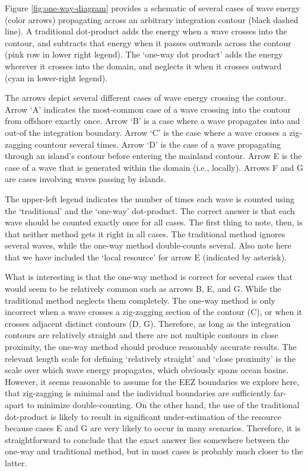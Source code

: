 Figure \ref{fig:one-way-diagram} provides a schematic of several cases of wave energy (color arrows) propagating across an arbitrary integration contour (black dashed line). A traditional dot-product adds the energy when a wave crosses into the contour, and subtracts that energy when it passes outwards across the contour (pink row in lower right legend). The `one-way dot product' adds the energy wherever it crosses into the domain, and neglects it when it crosses outward (cyan in lower-right legend).

The arrows depict several different cases of wave energy crossing the contour. Arrow `A' indicates the most-common case of a wave crossing into the contour from offshore exactly once. Arrow `B' is a case where a wave propagates into and out-of the integration boundary. Arrow `C' is the case where a wave crosses a zig-zagging countour several times. Arrow `D' is the case of a wave propagating through an island's contour before entering the mainland contour. Arrow E is the case of a wave that is generated within the domain (i.e., locally). Arrows F and G are cases involving waves passing by islands.

The upper-left legend indicates the number of times each wave is counted using the `traditional' and the `one-way' dot-product. The correct answer is that each wave should be counted exactly once for all cases. The first thing to note, then, is that neither method gets it right in all cases. The traditional method ignores several waves, while the one-way method double-counts several. Also note here that we have included the `local resource' for arrow E (indicated by asterisk).

What is interesting is that the one-way method is correct for several cases that would seem to be relatively common such as arrows B, E, and G. While the traditional method neglects them completely. The one-way method is only incorrect when a wave crosses a zig-zagging section of the contour (C), or when it crosses adjacent distinct contours (D, G). Therefore, as long as the integration contours are relatively straight and there are not multiple contours in close proximity, the one-way method should produce reasonably accurate results. 
The relevant length scale for defining `relatively straight' and `close proximity' is the scale over which wave energy propagates, which obviously spans ocean basins. However, it seems reasonable to assume for the EEZ boundaries we explore here, that zig-zagging is minimal and the individual boundaries are sufficiently far-apart to minimize double-counting. On the other hand, the use of the traditional dot-product is likely to result in significant under-estimation of the resource because cases E and G are very likely to occur in many scenarios. Therefore, it is straightforward to conclude that the exact answer lies somewhere between the one-way and traditional method, but in most cases is probably much closer to the latter.

